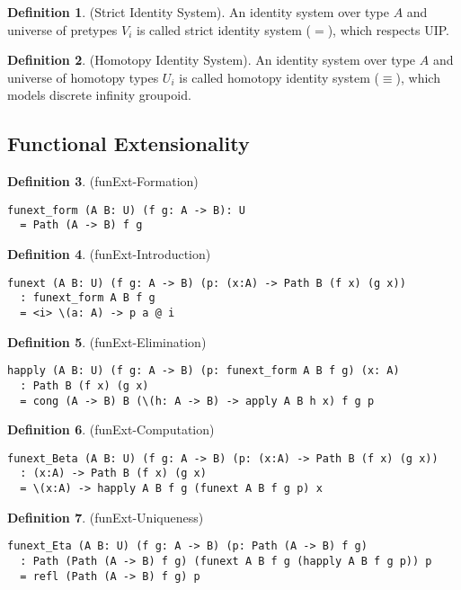 \documentclass{article}
\theoremstyle{definition}
\newtheorem{definition}{Definition}
\begin{document}
\begin{definition} (Strict Identity System).
An identity system over type $A$ and universe
of pretypes $V_i$ is called strict identity system ($=$), which respects UIP.
\end{definition}

\begin{definition} (Homotopy Identity System).
An identity system over type $A$ and universe of homotopy
types $U_i$ is called homotopy identity system ($\equiv$),
which models discrete infinity groupoid.
\end{definition}

\newpage
\subsection{Functional Extensionality}

\begin{definition} (funExt-Formation)
\begin{lstlisting}
funext_form (A B: U) (f g: A -> B): U
  = Path (A -> B) f g
\end{lstlisting}
\end{definition}

\begin{definition} (funExt-Introduction)
\begin{lstlisting}
funext (A B: U) (f g: A -> B) (p: (x:A) -> Path B (f x) (g x))
  : funext_form A B f g
  = <i> \(a: A) -> p a @ i
\end{lstlisting}
\end{definition}

\begin{definition} (funExt-Elimination)
\begin{lstlisting}
happly (A B: U) (f g: A -> B) (p: funext_form A B f g) (x: A)
  : Path B (f x) (g x)
  = cong (A -> B) B (\(h: A -> B) -> apply A B h x) f g p
\end{lstlisting}
\end{definition}

\begin{definition} (funExt-Computation)
\begin{lstlisting}
funext_Beta (A B: U) (f g: A -> B) (p: (x:A) -> Path B (f x) (g x))
  : (x:A) -> Path B (f x) (g x)
  = \(x:A) -> happly A B f g (funext A B f g p) x
\end{lstlisting}
\end{definition}

\begin{definition} (funExt-Uniqueness)
\begin{lstlisting}
funext_Eta (A B: U) (f g: A -> B) (p: Path (A -> B) f g)
  : Path (Path (A -> B) f g) (funext A B f g (happly A B f g p)) p
  = refl (Path (A -> B) f g) p
\end{lstlisting}
\end{definition}
\end{document}
